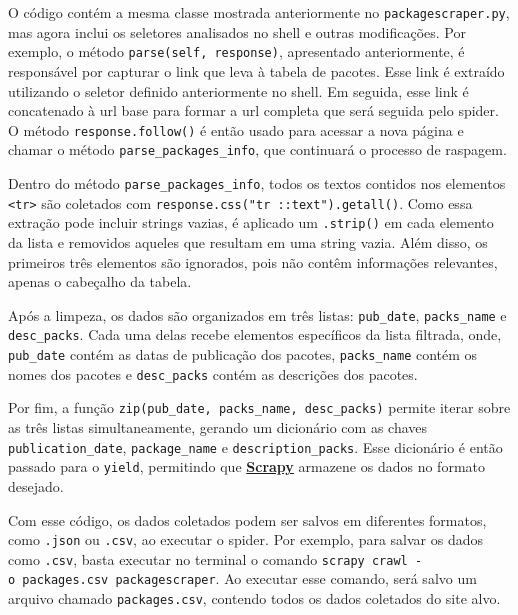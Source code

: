 \documentclass[
  12pt,
  a4paper,
]{scrreprt}
\begin{document}
O código contém a mesma classe mostrada anteriormente no
\texttt{packagescraper.py}, mas agora inclui os seletores analisados no
shell e outras modificações. Por exemplo, o método
\texttt{parse(self,\ response)}, apresentado anteriormente, é
responsável por capturar o link que leva à tabela de pacotes. Esse link
é extraído utilizando o seletor definido anteriormente no shell. Em
seguida, esse link é concatenado à url base para formar a url completa
que será seguida pelo spider. O método \texttt{response.follow()} é
então usado para acessar a nova página e chamar o método
\texttt{parse\_packages\_info}, que continuará o processo de raspagem.

\vspace{12pt}

Dentro do método \texttt{parse\_packages\_info}, todos os textos
contidos nos elementos \texttt{\textless{}tr\textgreater{}} são
coletados com \texttt{response.css("tr\ ::text").getall()}. Como essa
extração pode incluir strings vazias, é aplicado um \texttt{.strip()} em
cada elemento da lista e removidos aqueles que resultam em uma string
vazia. Além disso, os primeiros três elementos são ignorados, pois não
contêm informações relevantes, apenas o cabeçalho da tabela.

\vspace{12pt}

Após a limpeza, os dados são organizados em três listas:
\texttt{pub\_date}, \texttt{packs\_name} e \texttt{desc\_packs}. Cada
uma delas recebe elementos específicos da lista filtrada, onde,
\texttt{pub\_date} contém as datas de publicação dos pacotes,
\texttt{packs\_name} contém os nomes dos pacotes e \texttt{desc\_packs}
contém as descrições dos pacotes.

\vspace{12pt}

Por fim, a função \texttt{zip(pub\_date,\ packs\_name,\ desc\_packs)}
permite iterar sobre as três listas simultaneamente, gerando um
dicionário com as chaves \texttt{publication\_date},
\texttt{package\_name} e \texttt{description\_packs}. Esse dicionário é
então passado para o \texttt{yield}, permitindo que
\href{https://docs.scrapy.org/en/latest}{\textbf{Scrapy}} armazene os
dados no formato desejado.

\vspace{12pt}

Com esse código, os dados coletados podem ser salvos em diferentes
formatos, como \texttt{.json} ou \texttt{.csv}, ao executar o spider.
Por exemplo, para salvar os dados como \texttt{.csv}, basta executar no
terminal o comando
\texttt{scrapy\ crawl\ -o\ packages.csv\ packagescraper}. Ao executar
esse comando, será salvo um arquivo chamado \texttt{packages.csv},
contendo todos os dados coletados do site alvo.
\end{document}
